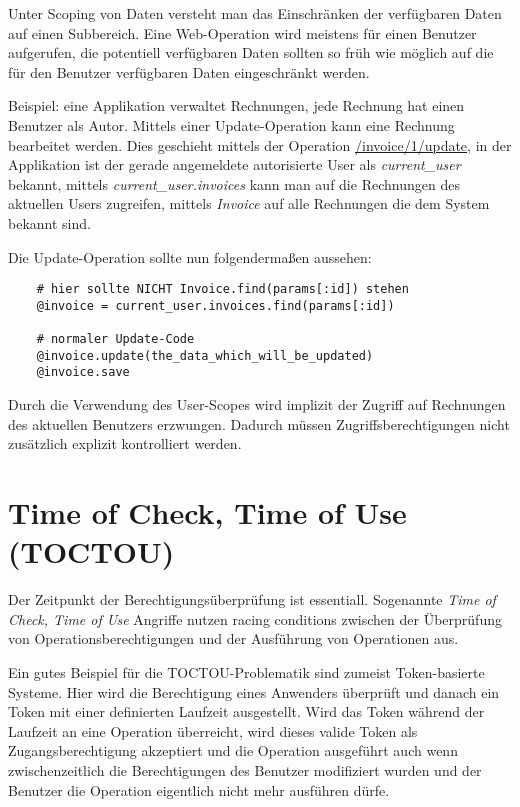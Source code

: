 Unter Scoping von Daten versteht man das Einschränken der verfügbaren Daten auf einen Subbereich. Eine Web-Operation wird meistens für einen Benutzer aufgerufen, die potentiell verfügbaren Daten sollten so früh wie möglich auf die für den Benutzer verfügbaren Daten eingeschränkt werden.

Beispiel: eine Applikation verwaltet Rechnungen, jede Rechnung hat einen Benutzer als Autor. Mittels einer Update-Operation kann eine Rechnung bearbeitet werden. Dies geschieht mittels der Operation \url{/invoice/1/update}, in der Applikation ist der gerade angemeldete autorisierte User als \textit{current\_user} bekannt, mittels \textit{current\_user.invoices} kann man auf die Rechnungen des aktuellen Users zugreifen, mittels \textit{Invoice} auf alle Rechnungen die dem System bekannt sind.

Die Update-Operation sollte nun folgendermaßen aussehen:

\begin{verbatim}
	# hier sollte NICHT Invoice.find(params[:id]) stehen
	@invoice = current_user.invoices.find(params[:id])

	# normaler Update-Code
	@invoice.update(the_data_which_will_be_updated)
	@invoice.save
\end{verbatim}

Durch die Verwendung des User-Scopes wird implizit der Zugriff auf Rechnungen des aktuellen Benutzers erzwungen. Dadurch müssen Zugriffsberechtigungen nicht zusätzlich explizit kontrolliert werden.

\section{Time of Check, Time of Use (TOCTOU)}

Der Zeitpunkt der Berechtigungsüberprüfung ist essentiall. Sogenannte \textit{Time of Check, Time of Use} Angriffe nutzen racing conditions zwischen der Überprüfung von Operationsberechtigungen und der Ausführung von Operationen aus.

Ein gutes Beispiel für die TOCTOU-Problematik sind zumeist Token-basierte Systeme. Hier wird die Berechtigung eines Anwenders überprüft und danach ein Token mit einer definierten Laufzeit ausgestellt. Wird das Token während der Laufzeit an eine Operation überreicht, wird dieses valide Token als Zugangsberechtigung akzeptiert und die Operation ausgeführt auch wenn zwischenzeitlich die Berechtigungen des Benutzer modifiziert wurden und der Benutzer die Operation eigentlich nicht mehr ausführen dürfe.

